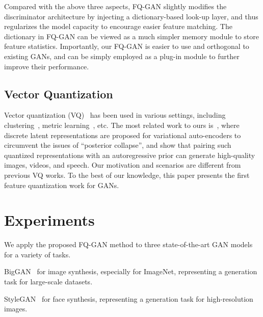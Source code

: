\documentclass{article}
\begin{document}
Compared with the above three aspects, 
FQ-GAN slightly modifies the discriminator architecture by injecting a dictionary-based look-up layer, and thus regularizes the model capacity to encourage easier feature matching. The dictionary in FQ-GAN can be viewed as a much simpler memory module to store feature statistics.
Importantly, our FQ-GAN is easier to use and orthogonal to existing GANs, and can be simply employed as a plug-in module to further improve their performance. 


\subsection{Vector Quantization}

Vector quantization (VQ)~\citep{gray1984vector} has been used in various settings, including clustering~\cite{equitz1989new}, metric learning~\cite{schneider2009distance}, etc.
The most related work to ours is~\citep{van2017neural}, where discrete latent representations are proposed for variational auto-encoders to circumvent the issues of ``posterior collapse'', and show that pairing such quantized representations with an autoregressive prior can generate high-quality images, videos, and speech. 
Our motivation and scenarios are different from previous VQ works. To the best of our knowledge, this paper presents the first feature quantization work for GANs. 

\vspace{-2mm}
\section{Experiments}





We apply the proposed FQ-GAN method to three state-of-the-art GAN models for a variety of tasks. 
 
BigGAN~\citep{brock2018large} for image synthesis, especially for ImageNet, representing a generation task for large-scale datasets.
 
StyleGAN~\citep{karras2019style,karras2019analyzing} for face synthesis, representing a generation task for high-resolution images.
 
\end{document}

